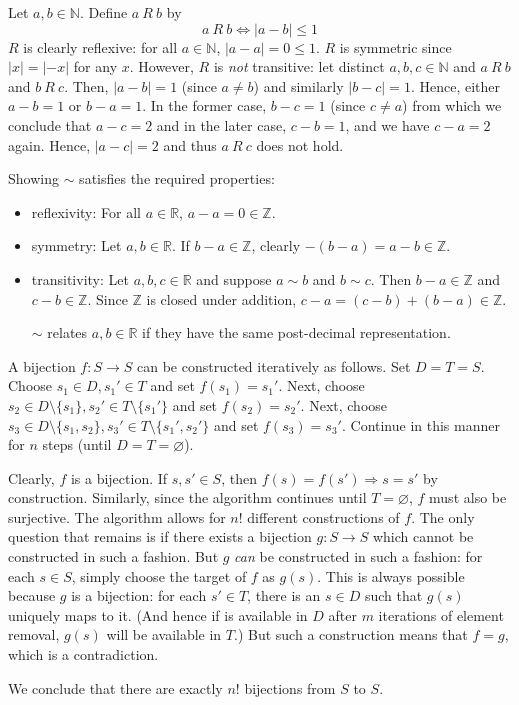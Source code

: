 \documentclass[a4paper]{report}
\newenvironment{ex}[1]
    {\noindent{\large \bf Exercise #1.}}{\vspace{0.5cm}}
\begin{document}
\begin{ex}{1.5}
 Let $a, b \in \mathbb{N}$. Define $a~R~b$ by
 \[
   a~R~b \Longleftrightarrow |a - b| \leq 1
  \]
  $R$ is clearly reflexive: for all $a \in \mathbb{N}$, $|a - a| = 0 \leq 1$. $R$ is symmetric since
  $|x| = |-x|$ for any $x$. However, $R$ is \emph{not} transitive: let distinct $a, b, c \in
  \mathbb{N}$ and $a~R~b$ and $b~R~c$. Then, $|a - b| = 1$ (since $a \neq b$) and similarly $|b - c| = 1$. Hence,
  either $a - b = 1$ or $b - a = 1$. In the former case, $b - c = 1$ (since $c \neq a$) from which we conclude
  that $a - c = 2$ and in the later case, $c - b = 1$, and we have $c - a = 2$ again. Hence, $|a - c| = 2$ and thus
  $a~R~c$ does not hold.
\end{ex}

\begin{ex}{1.6}
  Showing $\sim$ satisfies the required properties:
  \begin{itemize}
  \item reflexivity: For all $a \in \mathbb{R}$, $a -a = 0 \in \mathbb{Z}$.
  \item symmetry: Let $a, b \in \mathbb{R}$. If $b - a \in \mathbb{Z}$, clearly $-(b - a) = a - b \in \mathbb{Z}$.
  \item transitivity: Let $a, b, c \in \mathbb{R}$ and suppose $a \sim b$ and $b \sim c$. Then $b-a \in \mathbb{Z}$ and $c - b \in \mathbb{Z}$. Since 
    $\mathbb{Z}$ is closed under addition, $c - a = (c-b) + (b - a) \in \mathbb{Z}$.

    $\sim$ relates $a,b \in \mathbb{R}$ if they have the same post-decimal representation.
  \end{itemize}
\end{ex}
\begin{ex}{2.1}
  A bijection $f : S \rightarrow S$ can be constructed iteratively as
  follows. Set $D = T = S$.  Choose $s_1 \in D, s_1' \in T$ and set
  $f(s_1) = s_1'$. Next, choose $s_2 \in D \setminus \{s_1\}, s_2' \in
  T \setminus \{s_1'\}$ and set $f(s_2) = s_2'$.  Next, choose $s_3
  \in D \setminus \{s_1, s_2\}, s_3' \in T \setminus \{s_1',s_2'\}$
  and set $f(s_3) = s_3'$.  Continue in this manner for $n$ steps
  (until $D = T = \varnothing$).

  Clearly, $f$ is a bijection. If $s, s' \in S$, then $f(s) = f(s')
  \Rightarrow s = s'$ by construction.  Similarly, since the algorithm
  continues until $T = \varnothing$, $f$ must also be surjective.  The
  algorithm allows for $n!$ different constructions of $f$. The only
  question that remains is if there exists a bijection $g : S
  \rightarrow S$ which cannot be constructed in such a fashion.  But
  $g$ \emph{can} be constructed in such a fashion: for each $s \in S$,
  simply choose the target of $f$ as $g(s)$. This is always possible
  because $g$ is a bijection: for each $s' \in T$, there is an $s \in
  D$ such that $g(s)$ uniquely maps to it. (And hence if is available
  in $D$ after $m$ iterations of element removal, $g(s)$ will be
  available in $T$.) But such a construction means that $f = g$, which
  is a contradiction.

  We conclude that there are exactly $n!$ bijections from $S$ to $S$.
  
\end{ex}
\end{document}
